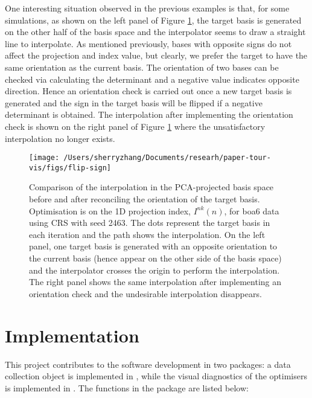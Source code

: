 One interesting situation observed in the previous examples is that, for
some simulations, as shown on the left panel of Figure
\ref{fig:flip-sign}, the target basis is generated on the other half of
the basis space and the interpolator seems to draw a straight line to
interpolate. As mentioned previously, bases with opposite signs do not
affect the projection and index value, but clearly, we prefer the target
to have the same orientation as the current basis. The orientation of
two bases can be checked via calculating the determinant and a negative
value indicates opposite direction. Hence an orientation check is
carried out once a new target basis is generated and the sign in the
target basis will be flipped if a negative determinant is obtained. The
interpolation after implementing the orientation check is shown on the
right panel of Figure \ref{fig:flip-sign} where the unsatisfactory
interpolation no longer exists.

\begin{Schunk}
\begin{figure}

{\centering \texttt{[image: /Users/sherryzhang/Documents/researh/paper-tour-vis/figs/flip-sign]} 

}

\caption[Comparison of the interpolation in the PCA-projected basis space before and after reconciling the orientation of the target basis]{Comparison of the interpolation in the PCA-projected basis space before and after reconciling the orientation of the target basis. Optimisation is on the 1D projection index, $I^{nk}(n)$, for boa6 data using CRS with seed 2463. The dots represent the target basis in each iteration and the path shows the interpolation. On the left panel, one target basis is generated with an opposite orientation to the current basis (hence appear on the other side of the basis space) and the interpolator crosses the origin to perform the interpolation. The right panel shows the same interpolation after implementing an orientation check and the undesirable interpolation disappears.}\label{fig:flip-sign}
\end{figure}
\end{Schunk}

\hypertarget{implementation}{%
\section{Implementation}\label{implementation}}

This project contributes to the software development in two packages: a
data collection object is implemented in  \citep{tourr},
while the visual diagnostics of the optimisers is implemented in
 \citep{ferrn}. The functions in the 
\citep{ferrn} package are listed below:

